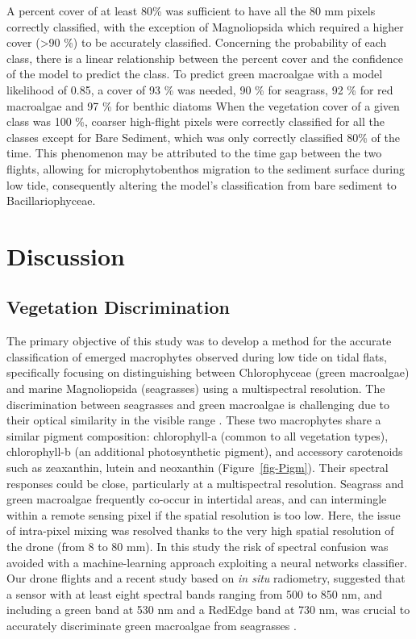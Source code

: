 \documentclass[
  number]{elsarticle}
\begin{document}
A percent cover of at least 80\% was sufficient to have all the 80 mm
pixels correctly classified, with the exception of Magnoliopsida which
required a higher cover (\textgreater90 \%) to be accurately classified.
Concerning the probability of each class, there is a linear relationship
between the percent cover and the confidence of the model to predict the
class. To predict green macroalgae with a model likelihood of 0.85, a
cover of 93 \% was needed, 90 \% for seagrass, 92 \% for red macroalgae
and 97 \% for benthic diatoms When the vegetation cover of a given class
was 100 \%, coarser high-flight pixels were correctly classified for all
the classes except for Bare Sediment, which was only correctly
classified 80\% of the time. This phenomenon may be attributed to the
time gap between the two flights, allowing for microphytobenthos
migration to the sediment surface during low tide, consequently altering
the model's classification from bare sediment to Bacillariophyceae.

\section{Discussion}\label{discussion}

\subsection{Vegetation Discrimination}\label{vegetation-discrimination}

The primary objective of this study was to develop a method for the
accurate classification of emerged macrophytes observed during low tide
on tidal flats, specifically focusing on distinguishing between
Chlorophyceae (green macroalgae) and marine Magnoliopsida (seagrasses)
using a multispectral resolution. The discrimination between seagrasses
and green macroalgae is challenging due to their optical similarity in
the visible range
\citep{oiry2021using, bannari2022, veettil2020opportunities}. These two
macrophytes share a similar pigment composition: chlorophyll-a (common
to all vegetation types), chlorophyll-b (an additional photosynthetic
pigment), and accessory carotenoids such as zeaxanthin, lutein and
neoxanthin (Figure~\ref{fig-Pigm}). Their spectral responses could be
close, particularly at a multispectral resolution. Seagrass and green
macroalgae frequently co-occur in intertidal areas, and can intermingle
within a remote sensing pixel if the spatial resolution is too low.
Here, the issue of intra-pixel mixing was resolved thanks to the very
high spatial resolution of the drone (from 8 to 80 mm). In this study
the risk of spectral confusion was avoided with a machine-learning
approach exploiting a neural networks classifier. Our drone flights and
a recent study based on \emph{in situ} radiometry, suggested that a
sensor with at least eight spectral bands ranging from 500 to 850 nm,
and including a green band at 530 nm and a RedEdge band at 730 nm, was
crucial to accurately discriminate green macroalgae from seagrasses
\citep{Davies2023}.
\end{document}
